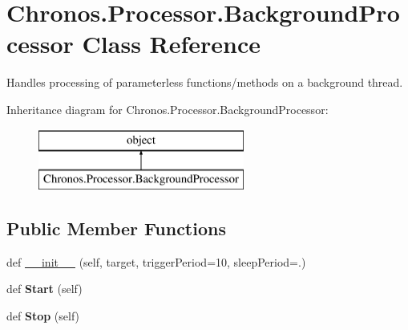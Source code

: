 \hypertarget{classChronos_1_1Processor_1_1BackgroundProcessor}{}\section{Chronos.\+Processor.\+Background\+Processor Class Reference}
\label{classChronos_1_1Processor_1_1BackgroundProcessor}


Handles processing of parameterless functions/methods on a background thread.  


Inheritance diagram for Chronos.\+Processor.\+Background\+Processor\+:\begin{figure}[H]
\begin{center}
\leavevmode
\includegraphics[height=2.000000cm]{classChronos_1_1Processor_1_1BackgroundProcessor}
\end{center}
\end{figure}
\subsection*{Public Member Functions}
\begin{DoxyCompactItemize}
\item 
def \hyperlink{classChronos_1_1Processor_1_1BackgroundProcessor_a389ce21b4d81861bfe10824e79c62db2}{\+\_\+\+\_\+init\+\_\+\+\_\+} (self, target, trigger\+Period=10, sleep\+Period=.)
\item 
def {\bfseries Start} (self)\hypertarget{classChronos_1_1Processor_1_1BackgroundProcessor_a11c2b828639d06508547273c0dd05ea4}{}\label{classChronos_1_1Processor_1_1BackgroundProcessor_a11c2b828639d06508547273c0dd05ea4}

\item 
def {\bfseries Stop} (self)\hypertarget{classChronos_1_1Processor_1_1BackgroundProcessor_aca69a0c374964bf984fcfa1df2d57e06}{}\label{classChronos_1_1Processor_1_1BackgroundProcessor_aca69a0c374964bf984fcfa1df2d57e06}

\end{DoxyCompactItemize}

